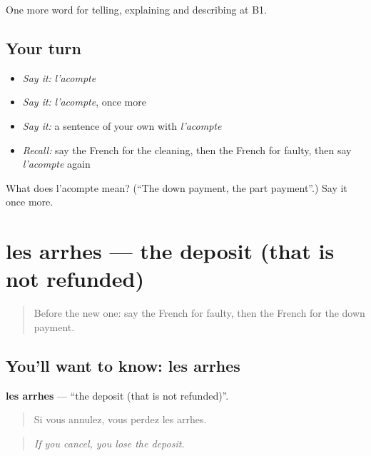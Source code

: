 \begin{grammarlens}[title={What you've built}]
One more word for telling, explaining and describing at B1.
\end{grammarlens}

\subsection*{Your turn}
\begin{itemize}
\raggedright
  \item \emph{Say it:} \emph{l'acompte}
  \item \emph{Say it:} \emph{l'acompte}, once more
  \item \emph{Say it:} a sentence of your own with \emph{l'acompte}
  \item \emph{Recall:} say the French for the cleaning, then the French for faulty, then say \emph{l'acompte} again
\end{itemize}

\begin{tcolorbox}[breakable,colback=teal!4,colframe=teal!35!black,title={Before you move on}]
What does l'acompte mean? (\textquotedblleft{}The down payment, the part payment\textquotedblright{}.) Say it once more.
\end{tcolorbox}
\section[les arrhes]{les arrhes — the deposit (that is not refunded)}

\label{lesson:FR-C433-arrhes}



\begin{quote}
Before the new one: say the French for faulty, then the French for the down payment.
\end{quote}

\subsection*{You'll want to know: les arrhes}
\textbf{les arrhes} — \textquotedblleft{}the deposit (that is not refunded)\textquotedblright{}.

\begin{quote}
Si vous annulez, vous perdez les arrhes.
\end{quote}

\begin{quote}
\emph{If you cancel, you lose the deposit.}
\end{quote}

